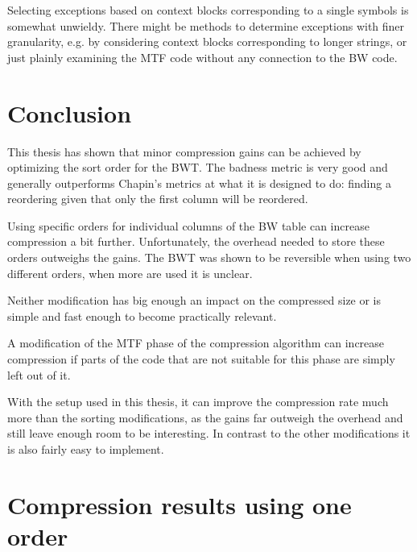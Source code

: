 \documentclass[a4paper]{scrreprt}
\begin{document}
Selecting exceptions based on context blocks corresponding to a single symbols
is somewhat unwieldy. There might be methods to determine exceptions with finer
granularity, e.g. by considering context blocks corresponding to longer strings,
or just plainly examining the MTF code without any connection to the BW code.

\chapter{Conclusion}

This thesis has shown that minor compression gains can be achieved by optimizing
the sort order for the BWT. The badness metric is very good and generally
outperforms Chapin's metrics at what it is designed to do: finding a reordering
given that only the first column will be reordered.

Using specific orders for individual columns of the BW table can increase
compression a bit further. Unfortunately, the overhead needed to store these
orders outweighs the gains. The BWT was shown to be reversible when using two
different orders, when more are used it is unclear. 

Neither modification has big enough an impact on the compressed size or is
simple and fast enough to become practically relevant.

A modification of the MTF phase of the compression algorithm can increase
compression if parts of the code that are not suitable for this phase are simply
left out of it.

With the setup used in this thesis, it can improve the compression rate much
more than the sorting modifications, as the gains far outweigh the overhead and
still leave enough room to be interesting. In contrast to the other
modifications it is also fairly easy to implement.

\appendix

\chapter{Compression results using one order}
\label{app:resultsoneorder}
\end{document}
